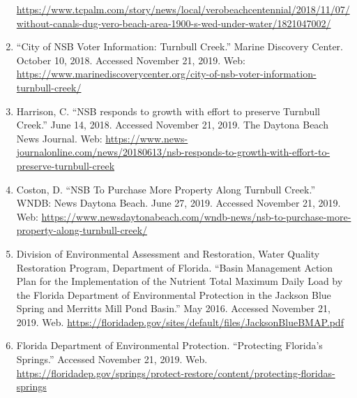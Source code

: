\documentclass[12pt,]{article}
\begin{document}
\begin{enumerate}
  \url{https://www.tcpalm.com/story/news/local/verobeachcentennial/2018/11/07/without-canals-dug-vero-beach-area-1900-s-wed-under-water/1821047002/}
\item
  ``City of NSB Voter Information: Turnbull Creek.'' Marine Discovery
  Center. October 10, 2018. Accessed November 21, 2019. Web:
  \url{https://www.marinediscoverycenter.org/city-of-nsb-voter-information-turnbull-creek/}
\item
  Harrison, C. ``NSB responds to growth with effort to preserve Turnbull
  Creek.'' June 14, 2018. Accessed November 21, 2019. The Daytona Beach
  News Journal. Web:
  \url{https://www.news-journalonline.com/news/20180613/nsb-responds-to-growth-with-effort-to-preserve-turnbull-creek}
\item
  Coston, D. ``NSB To Purchase More Property Along Turnbull Creek.''
  WNDB: News Daytona Beach. June 27, 2019. Accessed November 21, 2019.
  Web:
  \url{https://www.newsdaytonabeach.com/wndb-news/nsb-to-purchase-more-property-along-turnbull-creek/}
\item
  Division of Environmental Assessment and Restoration, Water Quality
  Restoration Program, Department of Florida. ``Basin Management Action
  Plan for the Implementation of the Nutrient Total Maximum Daily Load
  by the Florida Department of Environmental Protection in the Jackson
  Blue Spring and Merritts Mill Pond Basin.'' May 2016. Accessed
  November 21, 2019. Web.
  \url{https://floridadep.gov/sites/default/files/JacksonBlueBMAP.pdf}
\item
  Florida Department of Environmental Protection. ``Protecting Florida's
  Springs.'' Accessed November 21, 2019. Web.
  \url{https://floridadep.gov/springs/protect-restore/content/protecting-floridas-springs}
\end{enumerate}
\end{document}
